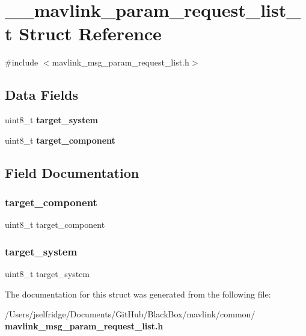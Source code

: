 \section{\+\_\+\+\_\+mavlink\+\_\+param\+\_\+request\+\_\+list\+\_\+t Struct Reference}
\label{struct____mavlink__param__request__list__t}


{\ttfamily \#include $<$mavlink\+\_\+msg\+\_\+param\+\_\+request\+\_\+list.\+h$>$}

\subsection*{Data Fields}
\begin{DoxyCompactItemize}
\item 
uint8\+\_\+t \textbf{ target\+\_\+system}
\item 
uint8\+\_\+t \textbf{ target\+\_\+component}
\end{DoxyCompactItemize}


\subsection{Field Documentation}
\mbox{\label{struct____mavlink__param__request__list__t_a1763123cfc5fa7f9c51ec44947d5790f}} 
\subsubsection{target\+\_\+component}
{\footnotesize\ttfamily uint8\+\_\+t target\+\_\+component}

\mbox{\label{struct____mavlink__param__request__list__t_ac9afff43526a157e4c4e45607c1418b8}} 
\subsubsection{target\+\_\+system}
{\footnotesize\ttfamily uint8\+\_\+t target\+\_\+system}



The documentation for this struct was generated from the following file\+:\begin{DoxyCompactItemize}
\item 
/\+Users/jselfridge/\+Documents/\+Git\+Hub/\+Black\+Box/mavlink/common/\textbf{ mavlink\+\_\+msg\+\_\+param\+\_\+request\+\_\+list.\+h}\end{DoxyCompactItemize}
